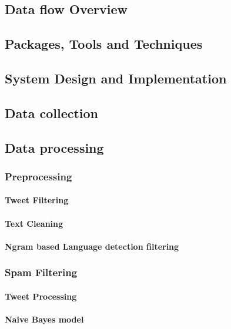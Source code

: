 \documentclass[oneside, 10pt]{article}
\begin{document}
		\subsection{Data flow Overview}\label{data-flow}
		
		\subsection{Packages, Tools and Techniques}\label{tools}
		
	\newpage
	
	\begin{center}	
		\section{System Design and Implementation}\label{implementation}
	\end{center}
		\subsection{Data collection}\label{collection}
		
		\subsection{Data processing}\label{processing}
			\subsubsection{Preprocessing}
				\paragraph{Tweet Filtering}
				\paragraph{Text Cleaning}
				\paragraph{Ngram based Language detection filtering}
			
			\subsubsection{Spam Filtering}
				\paragraph{Tweet Processing}
				\paragraph{Naive Bayes model}
\end{document}
